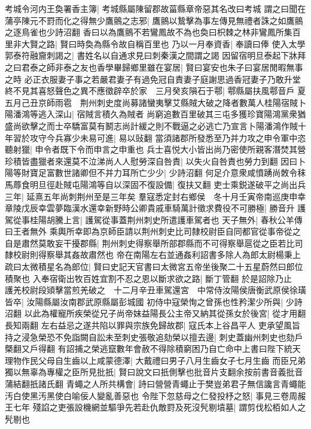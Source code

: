 考城令河内王奐署香主簿|{
	考城縣屬陳留郡故菑縣章帝惡其名改曰考城}
謂之曰聞在蒲亭陳元不罸而化之得無少鷹鸇之志邪|{
	鷹鸇以鷙擊為事左傳見無禮者誅之如鷹鸇之逐鳥雀也少詩沼翻}
香曰以為鷹鸇不若鸞鳳故不為也奐曰枳棘之林非鸞鳳所集百里非大賢之路|{
	賢曰時奐為縣令故自稱百里也}
乃以一月奉資香|{
	奉讀曰俸}
使入太學郭泰符融齎刺謁之|{
	書姓名以自通求見曰刺秦漢之間謂之謁}
因留宿明旦泰起下牀拜之曰君泰之師非泰之友也香學畢歸鄉里雖在宴居|{
	賢曰宴安也朱子曰宴居閒暇無事之時}
必正衣服妻子事之若嚴君妻子有過免冠自責妻子庭謝思過香冠妻子乃敢升堂終不見其喜怒聲色之異不應徵辟卒於家　三月癸亥隕石于鄠|{
	鄠縣屬扶風鄠音戶}
夏五月己丑京師雨雹　荆州刺史度尚募諸蠻夷擊艾縣賊大破之降者數萬人桂陽宿賊卜陽潘鴻等逃入深山|{
	宿賊言積久為賊者}
尚窮追數百里破其三屯多獲珍寶陽鴻黨衆猶盛尚欲擊之而士卒驕富莫有鬭志尚計緩之則不戰逼之必逃亡乃宣言卜陽潘鴻作賊十年習於攻守今兵寡少未易可進|{
	易以䜴翻}
當須諸郡所發悉至乃并力攻之申令軍中恣聽射獵|{
	申令者既下令而申言之申重也}
兵士喜悦大小皆出尚乃密使所親客潛焚其營珍積皆盡獵者來還莫不泣涕尚人人慰勞深自咎責|{
	以失火自咎責也勞力到翻}
因曰卜陽等財寶足富數世諸卿但不并力耳所亡少少|{
	少詩沼翻}
何足介意衆咸憤踴尚敇令秣馬蓐食明旦徑赴賊屯陽鴻等自以深固不復設備|{
	復扶又翻}
吏士乘鋭遂破平之尚出兵三年|{
	延熹五年尚刺荆州至是三年矣}
羣寇悉定封右鄉侯　冬十月壬寅帝南巡庚申幸章陵戊辰幸雲夢臨漢水還幸新野時公卿貴戚車騎萬計徵求費役不可勝極|{
	勝音升}
護駕從事桂陽胡騰上言|{
	護駕從事蓋荆州刺史所遣護車駕者也}
天子無外|{
	春秋公羊傳曰王者無外}
乘輿所幸即為京師臣請以荆州刺史比司隸校尉臣自同都官從事帝從之自是肅然莫敢妄干擾郡縣|{
	荆州刺史得察舉所部郡縣而不可得察舉扈從之臣若比司隸校尉則得察舉其姦故肅然也}
帝在南陽左右並通姦利詔書多除人為郎太尉楊秉上疏曰太微積星名為郎位|{
	賢曰史記天官書曰太微宮五帝坐後聚二十五星蔚然曰郎位積聚也}
入奉宿衛出牧百姓宜割不忍之恩以斷求欲之路|{
	斷丁管翻}
於是詔除乃止　護羌校尉段熲擊當煎羌破之　十二月辛丑車駕還宮　中常侍汝陽侯唐衡武原侯徐璜皆卒|{
	汝陽縣屬汝南郡武原縣屬彭城國}
初侍中寇榮恂之曾孫也性矜潔少所與|{
	少詩沼翻}
以此為權寵所疾榮從兄子尚帝妺益陽長公主帝又納其從孫女於後宮|{
	從才用翻長知兩翻}
左右益忌之遂共陷以罪與宗族免歸故郡|{
	寇氏本上谷昌平人}
吏承望風旨持之浸急榮恐不免詣闕自訟未至刺史張敬追劾榮以擅去邊|{
	刺史蓋幽州刺史也劾戶槩翻又戶得翻}
有詔捕之榮逃竄數年會赦不得除積窮困乃自亡命中上書曰陛下統天理物作民父母自生齒以上咸蒙德澤|{
	大戴禮曰男子八月生齒女子七月生齒}
而臣兄弟獨以無辜為專權之臣所見批扺|{
	賢曰說文曰扺側擊也批音片支翻余按前書音義批音蒲結翻扺諸氏翻}
青蠅之人所共構會|{
	詩曰營營青蠅止于樊豈弟君子無信讒言青蠅能汚白使黑汚黑使白喻佞人變亂善惡也}
令陛下忽慈母之仁發投杼之怒|{
	事見三卷周赧王七年}
殘諂之吏張設機網並驅爭先若赴仇敵罸及死沒髠剔墳墓|{
	謂剪伐松栢如人之髠剔也}
